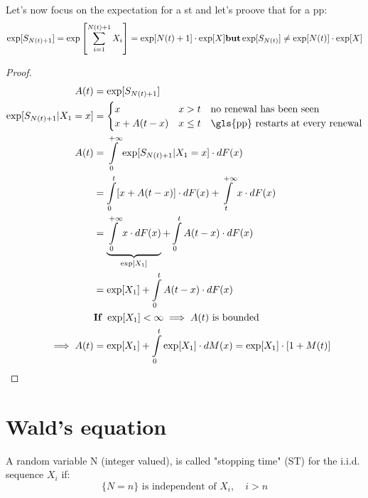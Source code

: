 \remark
Let's now focus on the expectation for a \gls{st} and let's proove that for a \gls{pp}:
\begin{equation}
	\exp[S_{N(t)+1}] = \exp\left[\sum\limits_{i=1}^{N(t)+1}X_i\right] = \exp[N(t)+1]\cdot \exp[X] \text{\textbf{but}} \exp[S_{N(t)}] \neq \exp[N(t)]\cdot \exp[X]
\end{equation}

\begin{proof}
	\begin{equation}\begin{split}
		A(t) &= \exp[S_{N(t)+1}]\\
		\exp[S_{N(t)+1}|X_1=x] &=
		\begin{cases}
			x & x>t \quad \text{no renewal has been seen} \\
			x + A(t-x) & x \le t \quad \text{\gls{pp} restarts at every renewal}
		\end{cases} \\
		A(t) &= \int\limits_0^{+\infty} \exp[S_{N(t)+1}|X_1 = x] \cdot dF(x) \\
		&= \int\limits_0^{t} [x+ A(t-x)] \cdot dF(x) + \int\limits_t^{+\infty} x \cdot dF(x) \\
		&= \underbrace{\int\limits_0^{+\infty} x \cdot dF(x)}_{\exp[X_1]} + \int\limits_0^{t} A(t-x) \cdot dF(x) \\
		&= \exp[X_1] + \int\limits_0^{t} A(t-x) \cdot dF(x)\\
		& \text{\textbf{If} }\exp[X_1] < \infty \implies A(t) \text{ is bounded} \\
		\implies A(t) &= \exp[X_1] + \int\limits_0^{t} \exp[X_1] \cdot dM(x) = \exp[X_1]\cdot [1+M(t)]\\
	\end{split}\end{equation}
\end{proof}

\section{Wald's equation}
\begin{definition}
A random variable N (integer valued), is called "stopping time" (ST) for the i.i.d. sequence $X_i$ if:
\begin{equation}
	\{N=n\} \text{ is independent of }X_i ,\quad i > n
\end{equation}
\end{definition}

